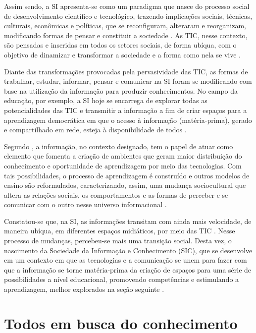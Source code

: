 \documentclass[portuguese]{textolivre}
\begin{document}
Assim sendo, a SI apresenta-se como um paradigma que nasce do processo
social de desenvolvimento científico e tecnológico, trazendo implicações
sociais, técnicas, culturais, econômicas e políticas, que se
reconfiguram, alteraram e reorganizam, modificando formas de pensar e
constituir a sociedade \cite{castells2016}. As TIC, nesse contexto, são
pensadas e inseridas em todos os setores sociais, de forma ubíqua, com o
objetivo de dinamizar e transformar a sociedade e a forma como nela se
vive \cite{abreu2001, silva2010}.

Diante das transformações provocadas pela pervasividade das TIC, as
formas de trabalhar, estudar, informar, pensar e comunicar na SI foram
se modificando com base na utilização da informação para produzir
conhecimentos. No campo da educação, por exemplo, a SI hoje se encarrega
de explorar todas as potencialidades das TIC e transmitir a informação a
fim de criar espaços para a aprendizagem democrática em que o acesso à
informação (matéria-prima), gerado e compartilhado em rede, esteja à
disponibilidade de todos \cite{santaella2013}.

Segundo \textcite{castells2016}, a informação, no contexto designado, tem o
papel de atuar como elemento que fomenta a criação de ambientes que
geram maior distribuição do conhecimento e oportunidade de aprendizagem
por meio das tecnologias. Com tais possibilidades, o processo de
aprendizagem é construído e outros modelos de ensino são reformulados,
caracterizando, assim, uma mudança sociocultural que altera as relações
sociais, os comportamentos e as formas de perceber e se comunicar com o
outro nesse universo informacional \cite{prensky2001}.

Constatou-se que, na SI, as informações transitam com ainda mais
velocidade, de maneira ubíqua, em diferentes espaços midiáticos, por
meio das TIC \cite{galvao2017}. Nesse processo de mudanças, percebeu-se
mais uma transição social. Desta vez, o nascimento da Sociedade da
Informação e Conhecimento (SIC), que se desenvolve em um contexto em que
as tecnologias e a comunicação se unem para fazer com que a informação
se torne matéria-prima da criação de espaços para uma série de
possibilidades a nível educacional, promovendo competências e
estimulando a aprendizagem, melhor explorados na seção seguinte
\cite{gomes2012}.



\section{Todos em busca do conhecimento}
\end{document}

